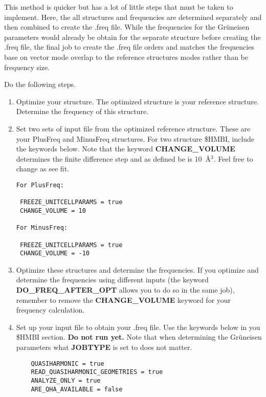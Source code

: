 \documentclass[11pt,letterpaper]{article}
\begin{document}
\begin{spacing}{1.0}
This method is quicker but has a lot of little steps that must
 be taken to implement. Here, the all structures and
frequencies are determined separately and then combined to create the .freq file. While the frequencies for
the  Gr\"{u}neisen  parameters would already be obtain for the separate structure before creating the .freq file,
the final job to create the .freq file orders and matches the frequencies base on vector mode overlap to 
the reference structures modes rather than be frequency size. 

Do the following steps.

\begin{enumerate}

  \item Optimize your structure. The optimized structure is your reference structure. Determine the frequency of this structure.
  \item Set two sets of input file from the optimized reference structure. These are your
    PlusFreq and MinusFreq structures. For two structure \$HMBI, include the keywords below. Note that the keyword {\bf CHANGE\_VOLUME}
    determines the finite difference step and as defined be is 10~\AA$^3$. Feel free to change as see fit.


\begin{verbatim}
For PlusFreq:

 FREEZE_UNITCELLPARAMS = true
 CHANGE_VOLUME = 10

For MinusFreq:

 FREEZE_UNITCELLPARAMS = true
 CHANGE_VOLUME = -10
\end{verbatim}

  \item Optimize these structures and determine the frequencies.
    If you optimize and determine the frequencies using different inputs (the keyword {\bf DO\_FREQ\_AFTER\_OPT} allows
    you to do so in the same job), remember to remove the {\bf CHANGE\_VOLUME} keyword for your frequency calculation.
  \item Set up your input file to obtain your .freq file. Use the keywords below in you \$HMBI section. {\bf Do not run yet.}
    Note that when determining the Gr\"{u}neisen parameters what {\bf JOBTYPE} is set to does not matter.

\begin{verbatim}
    QUASIHARMONIC = true
    READ_QUASIHARMONIC_GEOMETRIES = true
    ANALYZE_ONLY = true
    ARE_QHA_AVAILABLE = false
\end{verbatim}


\end{enumerate}
\end{spacing}
\end{document}
